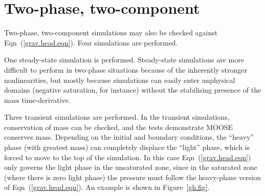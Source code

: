 \documentclass[]{scrreprt}
\begin{document}
\section{Two-phase, two-component}
\label{2phase.sec}

Two-phase, two-component simulations may also be checked against
Eqn~(\ref{grav.head.eqn}).  Four simulations are performed.

One steady-state simulation is performed.  Steady-state simulations are more
difficult to perform in two-phase situations because of the inherently
stronger nonlinearities, but mostly because simulations can easily enter
unphysical domains (negative saturation, for instance) without the stabilising
presence of the mass time-derivative.

Three transient simulations are performed.  In the
transient simulations, conservation of mass can be checked, and the
tests demonstrate MOOSE conserves mass.  Depending on the initial and
boundary conditions, the ``heavy'' phase (with greatest mass) can
completely displace the ``light'' phase, which is forced to move to
the top of the simulation.  In this case Eqn~(\ref{grav.head.eqn})
only governs the light phase in the unsaturated zone, since in the
saturated zone (where there is zero light phase) the pressure must
follow the heavy-phase version of Eqn~(\ref{grav.head.eqn}).  An
example is shown in Figure~\ref{gh.fig}.
\end{document}
